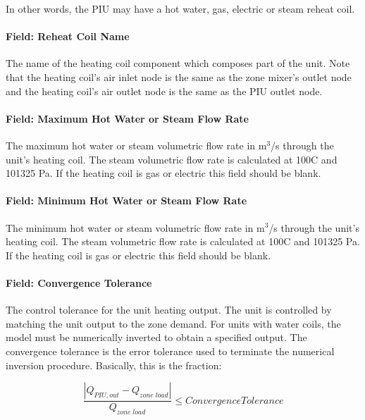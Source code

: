 In other words, the PIU may have a hot water, gas, electric or steam reheat coil.

\paragraph{Field: Reheat Coil Name}\label{field-reheat-coil-name-4}

The name of the heating coil component which composes part of the unit. Note that the heating coil's air inlet node is the same as the zone mixer's outlet node and the heating coil's air outlet node is the same as the PIU outlet node.

\paragraph{Field: Maximum Hot Water or Steam Flow Rate}\label{field-maximum-hot-water-or-steam-flow-rate-5}

The maximum hot water or steam volumetric flow rate in m\(^{3}\)/s through the unit's heating coil. The steam volumetric flow rate is calculated at 100C and 101325 Pa. If the heating coil is gas or electric this field should be blank.

\paragraph{Field: Minimum Hot Water or Steam Flow Rate}\label{field-minimum-hot-water-or-steam-flow-rate-5}

The minimum hot water or steam volumetric flow rate in m\(^{3}\)/s through the unit's heating coil. The steam volumetric flow rate is calculated at 100C and 101325 Pa. If the heating coil is gas or electric this field should be blank.

\paragraph{Field: Convergence Tolerance}\label{field-convergence-tolerance-4}

The control tolerance for the unit heating output. The unit is controlled by matching the unit output to the zone demand. For units with water coils, the model must be numerically inverted to obtain a specified output. The convergence tolerance is the error tolerance used to terminate the numerical inversion procedure. Basically, this is the fraction:

\begin{equation}
\frac{{\left| {{Q_{PIU,out}} - {Q_{zone\;load}}} \right|}}{{{Q_{zone\;load}}}} \le ConvergenceTolerance
\end{equation}

